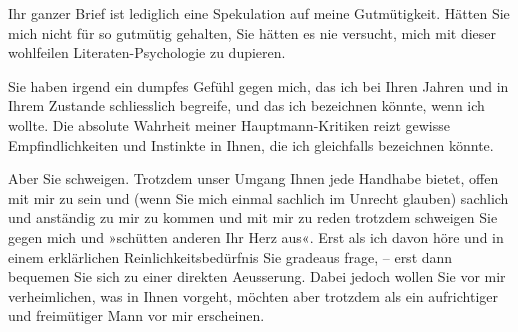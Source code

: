 \pstart
           Ihr ganzer Brief ist lediglich eine Spekulation auf meine Gutmütigkeit. Hätten Sie
               mich nicht für so gutmütig gehalten, Sie hätten es nie versucht, mich mit dieser
               wohlfeilen Literaten-Psychologie zu dupieren.\pend
           
\pstart
           Sie haben irgend ein dumpfes Gefühl gegen mich, das ich bei Ihren Jahren und in Ihrem
               Zustande schliesslich begreife, und das ich bezeichnen könnte, wenn ich wollte. Die
               absolute Wahrheit meiner Hauptmann-Kritiken reizt gewisse
               Empfindlichkeiten und Instinkte in Ihnen, die ich gleichfalls bezeichnen könnte.\pend
           
\pstart
           Aber Sie schweigen. Trotzdem unser Umgang Ihnen jede Handhabe bietet, offen mit mir
               zu sein und (wenn Sie mich einmal sachlich im Unrecht glauben) sachlich und anständig
               zu mir zu kommen und mit mir zu reden {\dotstwo} trotzdem schweigen
               Sie gegen mich und »schütten anderen Ihr Herz aus«. Erst als ich davon höre und in
               einem erklärlichen Reinlichkeitsbedürfnis Sie gradeaus frage, – erst dann bequemen
               Sie sich zu einer direkten Aeusserung. Dabei jedoch wollen Sie vor mir verheimlichen,
               was in Ihnen vorgeht, möchten aber trotzdem als ein aufrichtiger und freimütiger Mann
               vor mir erscheinen.\pend
           
